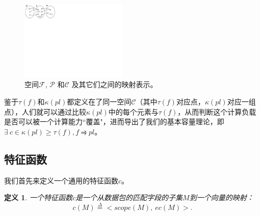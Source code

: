 \documentclass{ctexart}
\newtheorem{definition}{定义}
\begin{document}

\begin{figure}[tbh]
    \centering
    \vspace{-1mm}
    \includegraphics[clip, trim=0in 8.5in 9.8in 0in, width=2in]{figures/function-spaces.pdf}
    \vspace{-2mm}
    \caption{空间$\mathcal{F}$, $\mathcal{P}$ 和$\mathcal{C}$ 及其它们之间的映射表示。}
    \label{cap:fig:function-spaces}
    \vspace{-2mm}
\end{figure}

鉴于$\tau(f)$和$\kappa(pl)$都定义在了同一空间$\mathcal{C}$（其中$\tau(f)$对应点，$\kappa(pl)$对应一组点），人们就可以通过比较$\kappa(pl)$中的每个元素与$\tau(f)$，从而判断这个计算负载是否可以被一个计算能力``覆盖"，进而导出了我们的基本容量理论，即$\exists\ c \in \kappa(pl) \geq \tau(f), f \rightrightharpoons pl$。


\subsection{特征函数}


我们首先来定义一个通用的特征函数$c$。
\begin{definition} 一个特征函数$c$是一个从数据包的匹配字段的子集$M$到一个向量的映射：  
\begin{equation*}
c(M) \overset{\Delta}{=} <scope(M),\ ec(M)>.
\end{equation*}
\end{definition}
\end{document}
